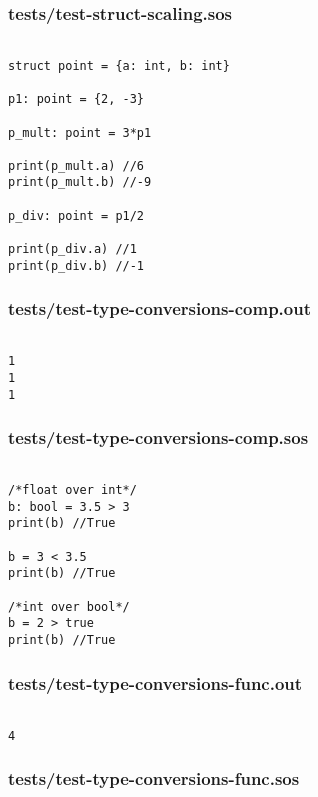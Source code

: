 \documentclass[main.tex]{subfiles}
\begin{document}
\subsubsection{tests/test-struct-scaling.sos}

\begin{lstlisting}

struct point = {a: int, b: int}

p1: point = {2, -3}

p_mult: point = 3*p1

print(p_mult.a) //6
print(p_mult.b) //-9

p_div: point = p1/2

print(p_div.a) //1
print(p_div.b) //-1

\end{lstlisting}

\subsubsection{tests/test-type-conversions-comp.out}

\begin{lstlisting}

1
1
1
\end{lstlisting}

\subsubsection{tests/test-type-conversions-comp.sos}

\begin{lstlisting}

/*float over int*/
b: bool = 3.5 > 3
print(b) //True

b = 3 < 3.5
print(b) //True

/*int over bool*/
b = 2 > true
print(b) //True
\end{lstlisting}

\subsubsection{tests/test-type-conversions-func.out}

\begin{lstlisting}

4
\end{lstlisting}

\subsubsection{tests/test-type-conversions-func.sos}
\end{document}
